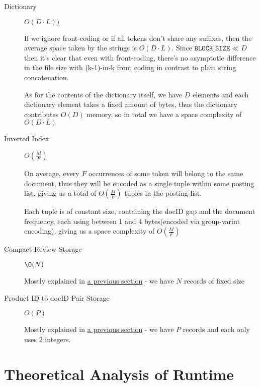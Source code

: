\documentclass[11pt]{article}
\begin{document}
\begin{description}	
	\item[Dictionary] $O(D \cdot L))$ 
	
	If we ignore front-coding or if all tokens don't share any suffixes, then the average space taken by
	the strings is $O(D \cdot L)$. Since $\texttt{BLOCK\_SIZE} \ll D$ then it's clear that even with front-coding,
	there's no asymptotic difference in the file size with (k-1)-in-k front coding in contrast to plain string concatenation.
	
	As for the contents of the dictionary itself, we have $D$ elements and each dictionary element takes a fixed amount of bytes,
	thus the dictionary contributes $O(D)$ memory, so in total we have a space complexity of $O(D \cdot L)$
	

	\item[Inverted Index] $O(\frac{M}{F})$
	
	On average, every $F$ occurrences of some token will belong to the same document, thus
	they will be encoded as a single tuple within some posting list, giving us a total of
	 $O(\frac{M}{F})$ tuples in the posting list.
	 
	 Each tuple is of constant size, containing the docID gap and the document frequency,
	 each using between 1 and 4 bytes(encoded via group-varint encoding), giving us a space complexity of $O(\frac{M}{F})$
	 
	 
	\item[Compact Review Storage] $\O(N)$
	 
	Mostly explained in \hyperref[sec:compactStorage]{a previous section} - we have $N$ records of fixed size
	 
	\item[Product ID to docID Pair Storage] $O(P)$ 
	 
	 Mostly explained in \hyperref[sec:pairStorage]{a previous section} - we have $P$ records and each only uses 2 integers.
	 
\end{description}
  
\section{Theoretical Analysis of Runtime}  

\begin{comment}
{\em Using the same variables, theoretically analyze the runtime of the functions of IndexReader. Include both the runtime and a short explanation.}
\end{comment}
\end{document}
